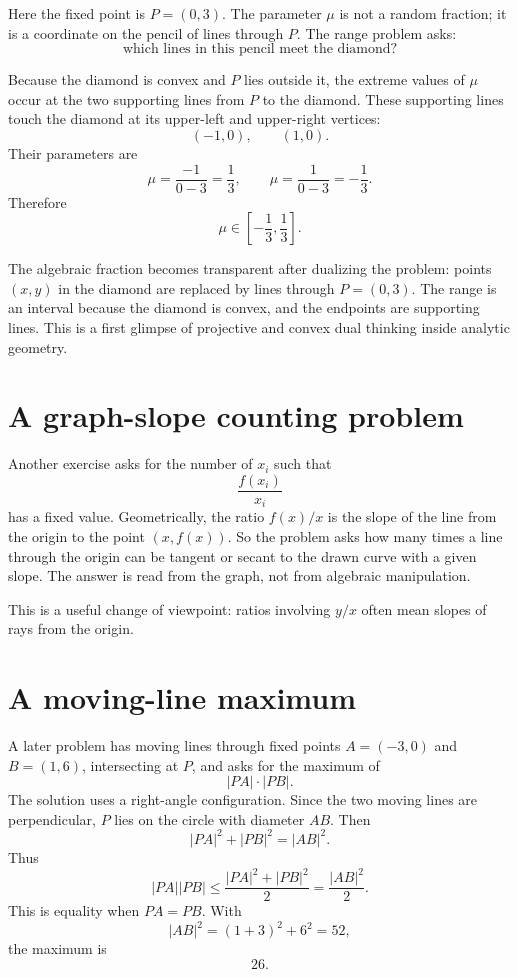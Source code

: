 Here the fixed point is \(P=(0,3)\).  The parameter \(\mu\) is not a random fraction; it is a coordinate on the pencil of lines through \(P\).  The range problem asks:
\[
  \text{which lines in this pencil meet the diamond?}
\]

Because the diamond is convex and \(P\) lies outside it, the extreme values of \(\mu\) occur at the two supporting lines from \(P\) to the diamond.  These supporting lines touch the diamond at its upper-left and upper-right vertices:
\[
  (-1,0),\qquad (1,0).
\]
Their parameters are
\[
  \mu=\frac{-1}{0-3}=\frac13,
  \qquad
  \mu=\frac{1}{0-3}=-\frac13.
\]
Therefore
\[
  \mu\in\left[-\frac13,\frac13\right].
\]

\begin{remark}
The algebraic fraction becomes transparent after dualizing the problem: points \((x,y)\) in the diamond are replaced by lines through \(P=(0,3)\).  The range is an interval because the diamond is convex, and the endpoints are supporting lines.  This is a first glimpse of projective and convex dual thinking inside analytic geometry.
\end{remark}

\section{A graph-slope counting problem}

Another exercise asks for the number of \(x_i\) such that
\[
  \frac{f(x_i)}{x_i}
\]
has a fixed value.  Geometrically, the ratio \(f(x)/x\) is the slope of the line from the origin to the point \((x,f(x))\).  So the problem asks how many times a line through the origin can be tangent or secant to the drawn curve with a given slope.  The answer is read from the graph, not from algebraic manipulation.

This is a useful change of viewpoint: ratios involving \(y/x\) often mean slopes of rays from the origin.

\section{A moving-line maximum}

A later problem has moving lines through fixed points \(A=(-3,0)\) and \(B=(1,6)\), intersecting at \(P\), and asks for the maximum of
\[
  |PA|\cdot |PB|.
\]
The solution uses a right-angle configuration.  Since the two moving lines are perpendicular, \(P\) lies on the circle with diameter \(AB\).  Then
\[
  |PA|^2+|PB|^2=|AB|^2.
\]
Thus
\[
  |PA||PB|\le\frac{|PA|^2+|PB|^2}{2}=\frac{|AB|^2}{2}.
\]
This is equality when \(PA=PB\).  With
\[
  |AB|^2=(1+3)^2+6^2=52,
\]
the maximum is
\[
  26.
\]

